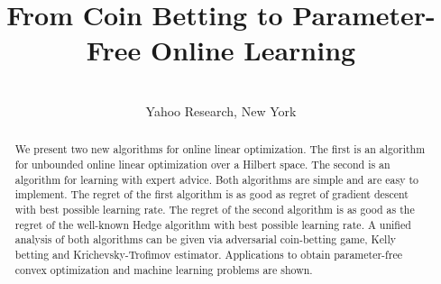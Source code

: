 \documentclass[wcp]{jmlr}
\author{%
\Name{Francesco Orabona}
\Email{francesco@orabona.com}
\AND
\Name{D\'avid P\'al}
\Email{dpal@yahoo-inc.com}\\
\addr Yahoo Research, New York}
\title{From Coin Betting to Parameter-Free Online Learning}
\begin{document}
\maketitle

\begin{abstract}
We present two new algorithms for online linear optimization.  The first is an
algorithm for unbounded online linear optimization over a Hilbert space.  The
second is an algorithm for learning with expert advice. Both algorithms are
simple and are easy to implement.  The regret of the first algorithm is as good
as regret of gradient descent with best possible learning rate. The regret of
the second algorithm is as good as the regret of the well-known Hedge algorithm
with best possible learning rate. A unified analysis of both algorithms can be
given via adversarial coin-betting game, Kelly betting and Krichevsky-Trofimov
estimator. Applications to obtain parameter-free convex optimization and machine learning problems are shown.
\end{abstract}









\end{document}
